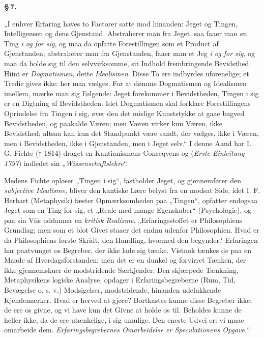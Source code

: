 \documentclass[12pt]{book}
\newcommand{\opage}[1]{\marginnote{\footnotesize\textit{[#1]}}}
\begin{document}
\begin{center}{\bfseries \S\,7.}\end{center}

„I enhver Erfaring haves to Factorer satte mod hinanden: Jeget og Tingen,
Intelligensen og dens Gjenstand. Abstraherer man fra Jeget, saa faaer man en Ting
\emph{i og for sig}, og maa da opfatte Forestillingen som et Product af Gjenstanden;
abstraherer man fra Gjenstanden, faaer man et Jeg \emph{i og for sig}, og maa da
holde sig til den selvvirksomme, sit Indhold frembringende Bevidsthed. Hiint er
\emph{Dogmatismen}, dette \emph{Idealismen}. Disse To ere indbyrdes uforenelige; et
Tredie gives ikke: her maa vælges. For at dømme Dogmatismen og Idealismen imellem,
mærke man sig Følgende: Jeget forekommer i Bevidstheden, Tingen i sig er en Digtning
af Bevidstheden. Idet Dogmatismen skal forklare Forestillingens Oprindelse fra
Tingen i sig, øver den det mislige Kunststykke at gaae bagved Bevidstheden, og
paakalde Væren; men Væren virker kun Væren, ikke Bevidsthed; altsaa kan kun det
Standpunkt være sandt, der vælges, ikke i Væren, men i Bevidstheden,
\opage{34} ikke i Gjenstanden, men i Jeget selv.“ I denne Aand har I. G. Fichte († 1814)
draget en Kantianismens Conseqvens og (\textit{Erste Einleitung 1797}) indledet sin
„\textit{Wissenschaftslehre}“.

Medens Fichte opløser „Tingen i sig“, fastholder Jeget, og gjennemfører den
\emph{subjective Idealisme}, bliver den kantiske Lære belyst fra en modsat Side,
idet I. F. Herbart (Metaphysik) fæster Opmærksomheden paa „Tingen“, opfatter
endogsaa Jeget som en Ting for sig, et „Reale med mange Egenskaber“ (Psychologie),
og paa sin Viis uddanner en \emph{kritisk Realisme}. „Erfaringsstoffet er
Philosophiens Grundlag; men som et blot Givet staaer det endnu udenfor Philosophien.
Hvad er da Philosophiens første Skridt, den Handling, hvormed den begynder?
Erfaringen har paatvunget os Begreber, der ikke lade sig tænke. Vistnok tænkes de
paa en Maade af Hverdagsforstanden; men det er en dunkel og forvirret Tænken, der
ikke gjennemskuer de modstridende Særkjender. Den skjærpede Tænkning, Metaphysikens
logiske Analyse, opdager i Erfaringsbegreberne (Rum, Tid, Bevægelse o. s. v.)
Modsigelser, modstridende, hinanden udelukkende Kjendemærker. Hvad er herved at
gjøre? Bortkastes kunne disse Begreber ikke; de ere os givne, og vi have kun det
Givne at holde os til. Beholdes kunne de heller ikke, da de ere utænkelige, i sig
umulige. Den eneste Udvei er: vi maae omarbeide dem. \emph{Erfaringsbegrebernes
Omarbeidelse er Speculationens Opgave.}“
\end{document}
